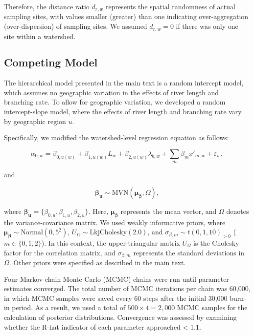 \documentclass[11pt, class=article, crop=false]{standalone}
\begin{document}
Therefore, the distance ratio $d_{r,w}$ represents the spatial randomness of actual sampling sites, with values smaller (greater) than one indicating over-aggregation (over-dispersion) of sampling sites.
We assumed $d_{r,w} = 0$ if there was only one site within a watershed.

\subsection{Competing Model}

The hierarchical model presented in the main text is a random intercept model, which assumes no geographic variation in the effects of river length and branching rate. To allow for geographic variation, we developed a random intercept-slope model, where the effects of river length and branching rate vary by geographic region $u$.

Specifically, we modified the watershed-level regression equation as follows:

\begin{equation}
    \alpha_{0, w} = \beta_{0, u(w)} + \beta_{1, u(w)} L_w + \beta_{2, u(w)} \lambda_{b, w} + \sum_m \beta_m x'_{m, w} + \varepsilon_{w},
    \label{eq:watershed-average}
\end{equation}

and

\begin{equation}
    \boldsymbol{\beta_u} \sim \mbox{MVN}(\boldsymbol{\mu_{\beta}}, \Omega),
\end{equation}

where $\boldsymbol{\beta_u} = \{\beta_{0, u}, \beta_{1, u}, \beta_{2, u}\}$. Here, $\boldsymbol{\mu_{\beta}}$ represents the mean vector, and $\Omega$ denotes the variance-covariance matrix.
We used weakly informative priors, where $\boldsymbol{\mu_{\beta}} \sim \mbox{Normal}(0, 5^2)$, $U_{\Omega} \sim \mbox{LkjCholesky}(2.0)$, and $\sigma_{\beta, m} \sim t(0, 1, 10)_{>0}$ ($m \in \{0, 1, 2\}$). In this context, the upper-triangular matrix $U_{\Omega}$ is the Cholesky factor for the correlation matrix, and $\sigma_{\beta, m}$ represents the standard deviations in $\Omega$.
Other priors were specified as described in the main text.

Four Markov chain Monte Carlo (MCMC) chains were run until parameter estimates
converged.
The total number of MCMC iterations per chain was 60,000, in which MCMC samples were saved every 60 steps after the initial 30,000 burn-in period.
As a result, we used a total of $500 \times 4 = 2,000$ MCMC samples for the calculation of posterior distributions.
Convergence was assessed by examining whether the R-hat indicator of each parameter approached < 1.1.
\end{document}
